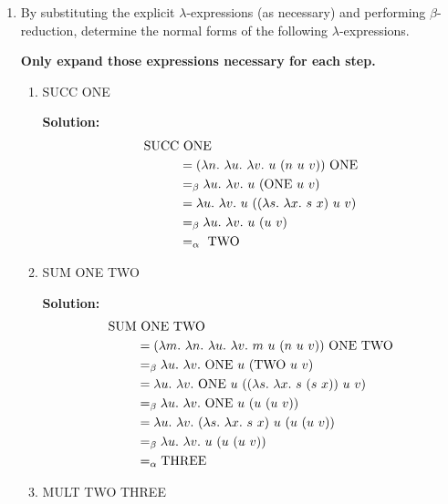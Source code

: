 \documentclass[11pt]{report}
\begin{document}
\begin{enumerate}
	\newpage
	\item By substituting the explicit $\lambda$-expressions (as necessary) and performing $\beta$-reduction, determine the normal forms of the following $\lambda$-expressions. 
	
	{\bf Only expand those expressions necessary for each step.}

	\begin{enumerate}
		\item SUCC ONE
		
		{\bf Solution:}
			\begin{align*}
				\SUCC &\ \ONE \\
				&= (\lambda n. \ \lambda u. \ \lambda v. \ u \ (n \ u \ v) ) \ \ONE \\
				&\beq \lambda u. \ \lambda v. \ u \ (\ONE \ u \ v) \\
				&= \lambda u. \ \lambda v. \ u \ ((\lambda s. \ \lambda x. \ s \ x) \ u \ v) \\
				&\beq \lambda u. \ \lambda v. \ u \ (u \ v) \\
				&\aeq \ \TWO 
			\end{align*}


		\item SUM ONE TWO 
		
		{\bf Solution:}
			\begin{align*}
				\SUM &\ \ONE \ \TWO \\
				&= (\lambda m. \ \lambda n. \ \lambda u. \ \lambda v. \ m \ u\ (n \ u \ v)) \ \ONE \ \TWO \\ 
				&\beq \lambda u. \ \lambda v. \ \ONE \ u\ (\TWO \ u \ v) \\
				&= \lambda u. \ \lambda v. \ \ONE \ u\ ((\lambda s. \ \lambda x. \ s \ (s \ x)) \ u \ v) \\
				&\beq \lambda u. \ \lambda v. \ \ONE \ u\ (u \ (u \ v)) \\
				&= \lambda u. \ \lambda v. \ (\lambda s. \ \lambda x. \ s \ x) \ u\ (u \ (u \ v)) \\
				&\beq \lambda u. \ \lambda v. \ u\ (u \ (u \ v))\\
				&\aeq \THREE
			\end{align*}

		\item MULT TWO THREE 
		

\end{enumerate}
\end{enumerate}
\end{document}
